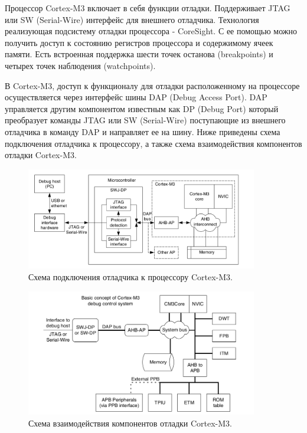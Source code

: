 Процессор Cortex-M3 включает в себя функции отладки. Поддерживает JTAG или SW (Serial-Wire) интерфейс для внешнего отладчика. Технология реализующая подсистему отладки процессора - CoreSight. С ее помощью можно получить доступ к состоянию регистров процессора и содержимому ячеек памяти. Есть встроенная поддержка шести точек останова (breakpoints) и четырех точек наблюдения (watchpoints).

В Cortex-M3, доступ к функционалу для отладки расположенному на процессоре осуществляется через интерфейс шины DAP (Debug Access Port). DAP управляется другим компонентом известным как DP (Debug Port) который преобразует команды JTAG или SW (Serial-Wire) поступающие из внешнего отладчика в команду DAP и направляет ее на шину. Ниже приведены схема подключения отладчика к процессору, а также  схема взаимодействия компонентов отладки Cortex-M3. 


\begin{figure}[h!]
    \centering
    \includegraphics[width=0.9\textwidth]{cortex_m3_debug_connection.png}
    \caption{Схема подключения отладчика к процессору Cortex-M3.}
\end{figure}


\begin{figure}[h!]
    \centering
    \includegraphics[width=0.9\textwidth]{cortex_m3_inside_debug_subsystem.png}
    \caption{Схема взаимодействия компонентов отладки Cortex-M3.}
\end{figure}

